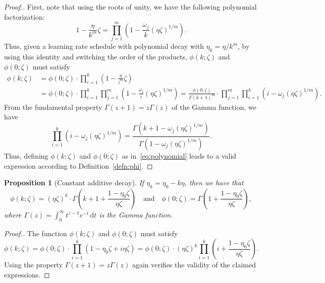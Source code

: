 \documentclass[11pt]{article}
\newtheorem{proposition}[theorem]{Proposition}
\begin{document}
\begin{proof}[Proof.]
First, note that using the roots of unity, we have the following polynomial factorization:
\[
    1 - \frac{\eta}{k^m} \zeta = \prod_{j=1}^m \left(1 - \frac{\omega_j}{k}(\eta \zeta)^{1/m}\right).
\]
Thus, given a learning rate schedule with polynomial decay with $\eta_k = \eta / k^m$, by using this identity and switching the order of the products, $\phi(k; \zeta)$ and $\phi(0; \zeta)$ must satisfy
\begin{align*}
    \phi(k; \zeta)
    &= \phi(0; \zeta) \cdot \prod_{i=1}^k \left( 1 - \frac{\eta}{i^m} \zeta \right) \\
    &= \phi(0; \zeta) \cdot \prod_{i=1}^k \prod_{j=1}^m \left(1 - \frac{\omega_j}{i}(\eta \zeta)^{1/m}\right)
    = \frac{\phi(0; \zeta)}{\Gamma(k+1)^m} \cdot \prod_{j=1}^m \prod_{i=1}^k \left(i - \omega_j(\eta \zeta)^{1/m}\right).
\end{align*}
From the fundamental property $\Gamma(z+1) = z \Gamma(z)$ of the Gamma function, we have
\[
    \prod_{i=1}^k \left(i - \omega_j(\eta \zeta)^{1/m}\right) = \frac{\Gamma(k+1 - \omega_j (\eta \zeta)^{1/m})}{\Gamma(1 - \omega_j (\eta \zeta)^{1/m})}.
\]
Thus, defining $\phi(k;\zeta)$ and $\phi(0;\zeta)$ as in~\eqref{eq:polynomial} leads to a valid expression according to Definition~\ref{defn:phi}.
\end{proof}

\begin{proposition}[Constant additive decay] \label{prop:constant-decay}
If $\eta_k = \eta_0 - k \eta$, then we have that 
\begin{equation} \label{eq:step}
    \phi(k; \zeta) = (\eta \zeta)^k \cdot \Gamma\left(k+1 + \frac{1-\eta_0 \zeta}{\eta \zeta}\right) \quad \text{and} \quad \phi(0; \zeta) =  \Gamma\left(1 + \frac{1-\eta_0 \zeta}{\eta \zeta}\right),
\end{equation}
where $\Gamma(z) = \int^\infty_0 t^{z-1} e^{-t} \,\mathrm{d}t$ is the Gamma function.
\end{proposition}
\begin{proof}[Proof.]
The function $\phi(k; \zeta)$ and $\phi(0; \zeta)$ must satisfy
\[
    \phi(k;\zeta)
    = \phi(0;\zeta) \cdot \prod_{i=1}^k (1 - \eta_0 \zeta + i \eta \zeta)
    = \phi(0;\zeta) \cdot (\eta \zeta)^k \prod_{i=1}^k \left(i + \frac{1 - \eta_0 \zeta}{\eta \zeta}\right).
\]
Using the property $\Gamma(z + 1) = z \Gamma (z)$ again verifies the validity of the claimed expressions.
\end{proof}
\end{document}
